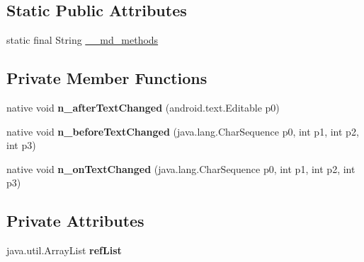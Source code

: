 \subsection*{Static Public Attributes}
\begin{DoxyCompactItemize}
\item 
static final String \hyperlink{classmd5b60ffeb829f638581ab2bb9b1a7f4f3f_1_1EditorRenderer_a05a5e2737d5175d2d79f153c42ba484d}{\+\_\+\+\_\+md\+\_\+methods}
\end{DoxyCompactItemize}
\subsection*{Private Member Functions}
\begin{DoxyCompactItemize}
\item 
\mbox{\label{classmd5b60ffeb829f638581ab2bb9b1a7f4f3f_1_1EditorRenderer_a6fa050a7e8b89d01fc6c51acafca5194}} 
native void {\bfseries n\+\_\+after\+Text\+Changed} (android.\+text.\+Editable p0)
\item 
\mbox{\label{classmd5b60ffeb829f638581ab2bb9b1a7f4f3f_1_1EditorRenderer_a8db46b5036f8f8cc07e8ee41c77b8142}} 
native void {\bfseries n\+\_\+before\+Text\+Changed} (java.\+lang.\+Char\+Sequence p0, int p1, int p2, int p3)
\item 
\mbox{\label{classmd5b60ffeb829f638581ab2bb9b1a7f4f3f_1_1EditorRenderer_ae07894d667938cbc7d7e06102fcf9f59}} 
native void {\bfseries n\+\_\+on\+Text\+Changed} (java.\+lang.\+Char\+Sequence p0, int p1, int p2, int p3)
\end{DoxyCompactItemize}
\subsection*{Private Attributes}
\begin{DoxyCompactItemize}
\item 
\mbox{\label{classmd5b60ffeb829f638581ab2bb9b1a7f4f3f_1_1EditorRenderer_a1cb544d5489e550f07655a227272eb99}} 
java.\+util.\+Array\+List {\bfseries ref\+List}
\end{DoxyCompactItemize}


